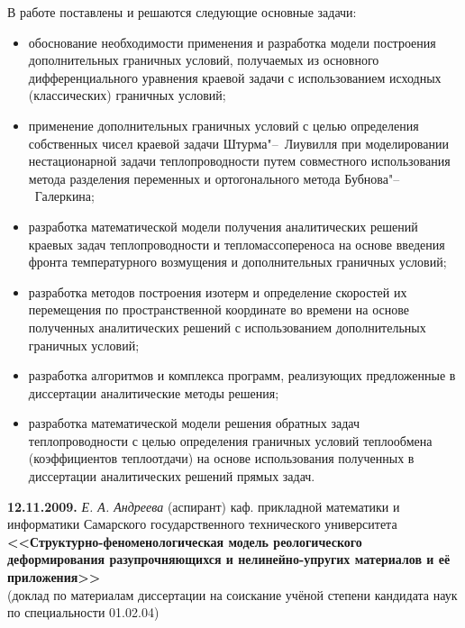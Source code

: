 {В работе поставлены и решаются следующие основные задачи:
\begin{itemize}
\item[--] обоснование необходимости применения и разработка модели построения дополнительных граничных условий, получаемых из основного дифференциального уравнения краевой задачи с использованием исходных (классических) граничных условий;

\item[--]  применение дополнительных граничных условий с целью определения собственных чисел краевой задачи Штурма"--~Лиувилля при моделировании нестационарной
задачи теплопроводности путем совместного использования метода разделения переменных и ортогонального метода Бубнова"--~Галеркина;

\item[--]  разработка математической модели получения аналитических решений краевых задач теплопроводности и тепломассопереноса на основе введения фронта температурного возмущения и дополнительных граничных условий;
\item[--]  разработка методов построения изотерм и определение скоростей их перемещения по пространственной координате во времени на основе полученных аналитических решений с использованием дополнительных граничных условий;
\item[--]  разработка алгоритмов и комплекса программ, реализующих предложенные в
диссертации аналитические методы решения;
\item[--]  разработка математической модели решения обратных задач теплопроводности с целью определения граничных условий теплообмена (коэффициентов теплоотдачи) на основе использования полученных в диссертации аналитических решений прямых задач.
\end{itemize}

}


\bigskip

\noindent
{\bf 12.11.2009.} {\it Е. А. Андреева} {\footnotesize (аспирант) каф. прикладной математики и информатики Самарского государственного технического университета} \\
{\bf <<Структурно-феноменологическая модель реологического деформирования разупрочняющихся и нелинейно-упругих материалов и её приложения>> }\\ {\footnotesize (доклад по материалам диссертации на соискание учёной степени кандидата наук по специальности 01.02.04)}

\smallskip

